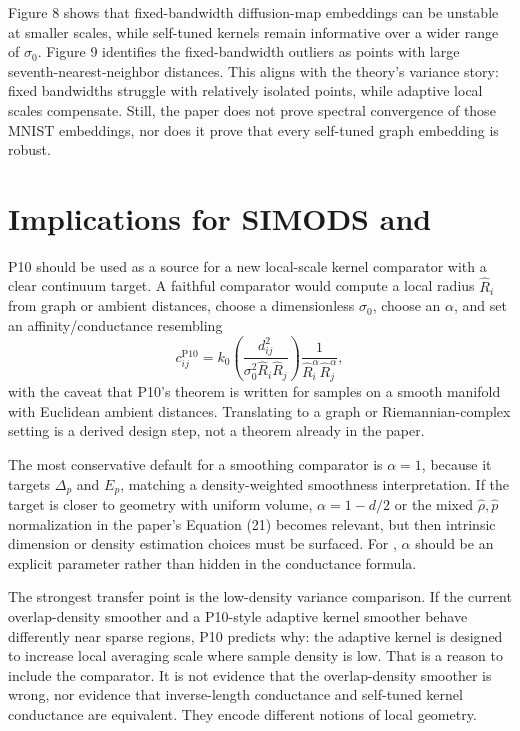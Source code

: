 \documentclass[11pt]{article}
\begin{document}
Figure 8 shows that fixed-bandwidth diffusion-map embeddings can be unstable
at smaller scales, while self-tuned kernels remain informative over a wider
range of \(\sigma_0\). Figure 9 identifies the fixed-bandwidth outliers as
points with large seventh-nearest-neighbor distances. This aligns with the
theory's variance story: fixed bandwidths struggle with relatively isolated
points, while adaptive local scales compensate. Still, the paper does not
prove spectral convergence of those MNIST embeddings, nor does it prove that
every self-tuned graph embedding is robust.

\section{Implications for SIMODS and }

P10 should be used as a source for a new local-scale kernel comparator with a
clear continuum target. A faithful comparator would compute a local radius
\(\widehat R_i\) from graph or ambient distances, choose a dimensionless
\(\sigma_0\), choose an \(\alpha\), and set an affinity/conductance resembling
\[
  c_{ij}^{\mathrm{P10}}
  =
  k_0\!\left(\frac{d_{ij}^2}{\sigma_0^2\widehat R_i\widehat R_j}\right)
  \frac{1}{\widehat R_i^\alpha\widehat R_j^\alpha},
\]
with the caveat that P10's theorem is written for samples on a smooth
manifold with Euclidean ambient distances. Translating to a graph or
Riemannian-complex setting is a derived design step, not a theorem already in
the paper.

The most conservative default for a smoothing comparator is \(\alpha=1\),
because it targets \(\Delta_p\) and \(E_p\), matching a density-weighted
smoothness interpretation. If the target is closer to geometry with uniform
volume, \(\alpha=1-d/2\) or the mixed \(\widehat\rho,\widehat p\)
normalization in the paper's Equation (21) becomes relevant, but then
intrinsic dimension or density estimation choices must be surfaced. For
, \(\alpha\) should be an explicit parameter rather than hidden in
the conductance formula.

The strongest transfer point is the low-density variance comparison. If the
current overlap-density smoother and a P10-style adaptive kernel smoother
behave differently near sparse regions, P10 predicts why: the adaptive kernel
is designed to increase local averaging scale where sample density is low.
That is a reason to include the comparator. It is not evidence that the
overlap-density smoother is wrong, nor evidence that inverse-length
conductance and self-tuned kernel conductance are equivalent. They encode
different notions of local geometry.
\end{document}

